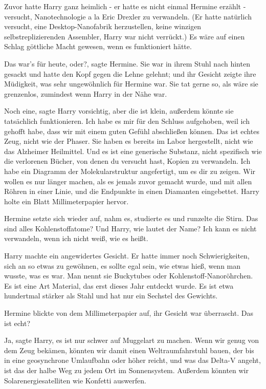 Zuvor hatte Harry ganz heimlich - er hatte es nicht einmal Hermine erzählt -
versucht, Nanotechnologie a la Eric Drexler zu verwandeln. (Er hatte natürlich
versucht, eine Desktop-Nanofabrik herzustellen, keine winzigen
selbstreplizierenden Assembler, Harry war nicht verrückt.) Es wäre auf einen
Schlag göttliche Macht gewesen, wenn es funktioniert hätte.

\glqq{}Das war's für heute, oder?\grqq{}, sagte Hermine. Sie war in ihrem Stuhl
nach hinten gesackt und hatte den Kopf gegen die Lehne gelehnt; und ihr Gesicht
zeigte ihre Müdigkeit, was sehr ungewöhnlich für Hermine war. Sie tat gerne so,
als wäre sie grenzenlos, zumindest wenn Harry in der Nähe war.

\glqq{}Noch eine\grqq{}, sagte Harry vorsichtig, \glqq{}aber die ist klein,
außerdem könnte sie tatsächlich funktionieren. Ich habe es mir für den Schluss
aufgehoben, weil ich gehofft habe, dass wir mit einem guten Gefühl abschließen
können. Das ist echtes Zeug, nicht wie der Phaser. Sie haben es bereits im Labor
hergestellt, nicht wie das Alzheimer Heilmittel. Und es ist eine generische
Substanz, nicht spezifisch wie die verlorenen Bücher, von denen du versucht
hast, Kopien zu verwandeln. Ich habe ein Diagramm der Molekularstruktur
angefertigt, um es dir zu zeigen. Wir wollen es nur länger machen, als es jemals
zuvor gemacht wurde, und mit allen Röhren in einer Linie, und die Endpunkte in
einen Diamanten eingebettet.\grqq{} Harry holte ein Blatt Millimeterpapier
hervor.

Hermine setzte sich wieder auf, nahm es, studierte es und runzelte die Stirn.
\glqq{}Das sind alles Kohlenstoffatome? Und Harry, wie lautet der Name? Ich kann
es nicht verwandeln, wenn ich nicht weiß, wie es heißt.\grqq{}

Harry machte ein angewidertes Gesicht. Er hatte immer noch Schwierigkeiten, sich
an so etwas zu gewöhnen, es sollte egal sein, wie etwas hieß, wenn man wusste,
was es war. \glqq{}Man nennt sie Buckytubes oder Kohlenstoff-Nanoröhrchen. Es
ist eine Art Material, das erst dieses Jahr entdeckt wurde. Es ist etwa
hundertmal stärker als Stahl und hat nur ein Sechstel des Gewichts.\grqq{}

Hermine blickte von dem Millimeterpapier auf, ihr Gesicht war überrascht.
\glqq{} Das ist echt?\grqq{}

\glqq{}Ja\grqq{}, sagte Harry, \glqq{}es ist nur schwer auf Muggelart zu machen.
Wenn wir genug von dem Zeug bekämen, könnten wir damit einen Weltraumfahrstuhl
bauen, der bis in eine geosynchrone Umlaufbahn oder höher reicht, und was das
Delta-V angeht, ist das der halbe Weg zu jedem Ort im Sonnensystem. Außerdem
könnten wir Solarenergiesatelliten wie Konfetti auswerfen.\grqq{}

